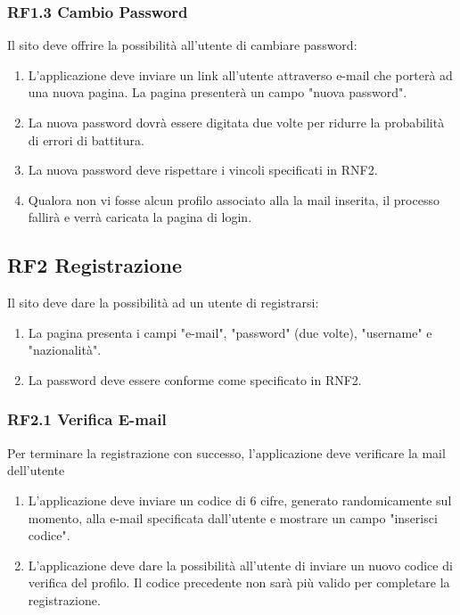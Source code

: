 \documentclass{report}
\begin{document}
\subsubsection*{RF1.3 Cambio Password}
Il sito deve offrire la possibilità all’utente di cambiare password:
	\begin{enumerate}
		\item L'applicazione deve inviare un link all'utente attraverso e-mail che porterà ad una nuova pagina. La pagina presenterà un campo "nuova password".
		
		\item La nuova password dovrà essere digitata due volte per ridurre la probabilità di errori di battitura.
		
		\item La nuova password deve rispettare i vincoli specificati in RNF2.
		
		\item Qualora non vi fosse alcun profilo associato alla la mail inserita, il processo fallirà e verrà caricata la pagina di login.
	\end{enumerate}


\subsection*{RF2 Registrazione}
Il sito deve dare la possibilità ad un utente di registrarsi:
\begin{enumerate}
	\item La pagina presenta i campi "e-mail", "password" (due volte), "username" e "nazionalità". 
	\item La password deve essere conforme come specificato in RNF2.
\end{enumerate}

\subsubsection*{RF2.1 Verifica E-mail}
Per terminare la registrazione con successo, l'applicazione deve verificare la mail dell'utente

\begin{enumerate}
	\item L'applicazione deve inviare un codice di 6 cifre, generato randomicamente sul momento, alla e-mail specificata dall’utente e mostrare un campo "inserisci codice".
		
	\item L'applicazione deve dare la possibilità all’utente di inviare un nuovo codice di verifica del profilo. Il codice precedente non sarà più valido per completare la registrazione.
		
\end{enumerate}
\end{document}
